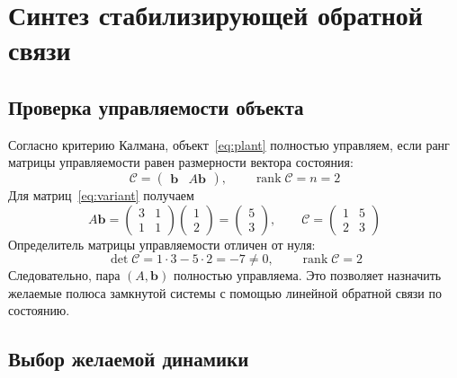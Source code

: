 \section{Синтез стабилизирующей обратной связи}

\subsection{Проверка управляемости объекта}

Согласно критерию Калмана, объект~\eqref{eq:plant} полностью управляем,
если ранг матрицы управляемости равен размерности вектора состояния:
\begin{equation}
  \mathcal C=\begin{pmatrix}\bm b&A\bm b\end{pmatrix},
  \qquad \operatorname{rank}\mathcal C=n=2
  \label{eq:controllability}
\end{equation}
Для матриц~\eqref{eq:variant} получаем
\begin{equation}
  A\bm b=
  \begin{pmatrix}3&1\\1&1\end{pmatrix}
  \begin{pmatrix}1\\2\end{pmatrix}
  =\begin{pmatrix}5\\3\end{pmatrix},
  \qquad
  \mathcal C=\begin{pmatrix}1&5\\2&3\end{pmatrix}
  \label{eq:controllability-numeric}
\end{equation}
Определитель матрицы управляемости отличен от нуля:
\begin{equation}
  \det\mathcal C=1\cdot3-5\cdot2=-7\ne0,
  \qquad \operatorname{rank}\mathcal C=2
  \label{eq:controllability-rank}
\end{equation}
Следовательно, пара $(A,\bm b)$ полностью управляема. Это позволяет
назначить желаемые полюса замкнутой системы с помощью линейной
обратной связи по состоянию.

\subsection{Выбор желаемой динамики}

